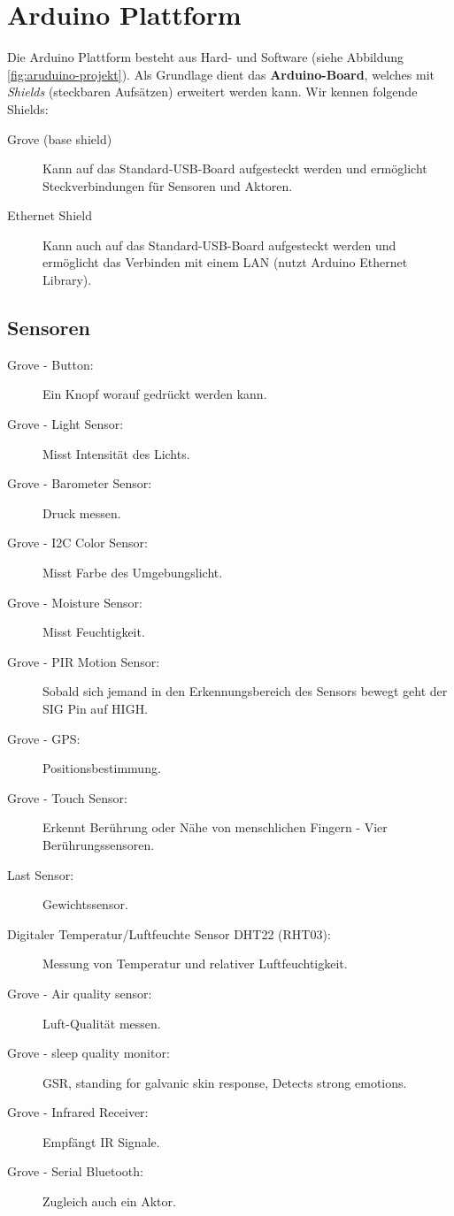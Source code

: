 \section{Arduino Plattform}
Die Arduino Plattform besteht aus Hard- und Software (siehe Abbildung \ref{fig:aruduino-projekt}). Als Grundlage dient das \textbf{Arduino-Board}, welches mit \emph{Shields} (steckbaren Aufsätzen) erweitert werden kann. Wir kennen folgende Shields:
\begin{description}
	\item[Grove (base shield)] Kann auf das Standard-USB-Board aufgesteckt werden und ermöglicht Steckverbindungen für Sensoren und Aktoren.
	\item[Ethernet Shield] Kann auch auf das Standard-USB-Board aufgesteckt werden und ermöglicht das Verbinden mit einem LAN (nutzt Arduino Ethernet Library).
\end{description}

\subsection{Sensoren}
\begin{description}
	\item[Grove - Button:] Ein Knopf worauf gedrückt werden kann.
	\item[Grove - Light Sensor:] Misst Intensität des Lichts. 
	\item[Grove - Barometer Sensor:] Druck messen.
	\item[Grove - I2C Color Sensor:] Misst Farbe des Umgebungslicht.
	\item[Grove - Moisture Sensor:] Misst Feuchtigkeit.
	\item[Grove - PIR Motion Sensor:] Sobald sich jemand in den Erkennungsbereich des Sensors bewegt geht der SIG Pin auf HIGH.
	\item[Grove - GPS:] Positionsbestimmung.
	\item[Grove - Touch Sensor:] Erkennt Berührung oder Nähe von menschlichen Fingern - Vier Berührungssensoren.
	\item[Last Sensor:] Gewichtssensor.
	\item[Digitaler Temperatur/Luftfeuchte Sensor DHT22 (RHT03):] Messung von Temperatur
	und relativer Luftfeuchtigkeit.
	\item[Grove - Air quality sensor:] Luft-Qualität messen.
	\item[Grove - sleep quality monitor:] GSR, standing for galvanic skin response, Detects strong emotions.
	\item[Grove - Infrared Receiver:] Empfängt IR Signale.
	\item[Grove - Serial Bluetooth:] Zugleich auch ein Aktor.
\end{description}

